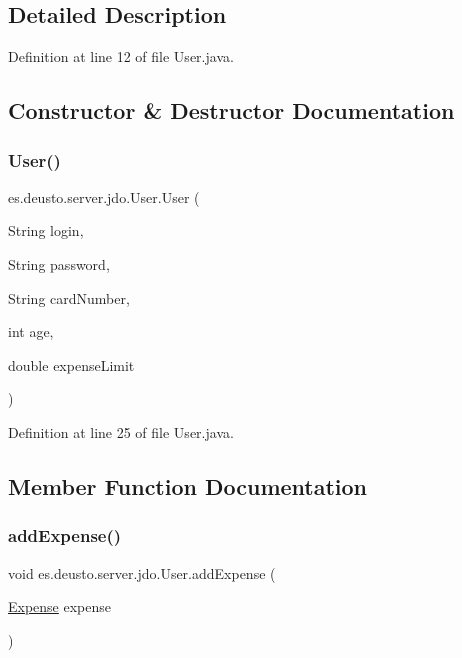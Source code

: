 \subsection{Detailed Description}


Definition at line 12 of file User.\+java.



\subsection{Constructor \& Destructor Documentation}
\mbox{\label{classes_1_1deusto_1_1server_1_1jdo_1_1_user_ae35fdda3d2752485c075bc12679a917a}} 
\subsubsection{\texorpdfstring{User()}{User()}}
{\footnotesize\ttfamily es.\+deusto.\+server.\+jdo.\+User.\+User (\begin{DoxyParamCaption}\item[{String}]{login,  }\item[{String}]{password,  }\item[{String}]{card\+Number,  }\item[{int}]{age,  }\item[{double}]{expense\+Limit }\end{DoxyParamCaption})}



Definition at line 25 of file User.\+java.



\subsection{Member Function Documentation}
\mbox{\label{classes_1_1deusto_1_1server_1_1jdo_1_1_user_a8a3a248ef33c0833a482d95150dde9df}} 
\subsubsection{\texorpdfstring{add\+Expense()}{addExpense()}}
{\footnotesize\ttfamily void es.\+deusto.\+server.\+jdo.\+User.\+add\+Expense (\begin{DoxyParamCaption}\item[{\hyperlink{classes_1_1deusto_1_1server_1_1jdo_1_1_expense}{Expense}}]{expense }\end{DoxyParamCaption})}



